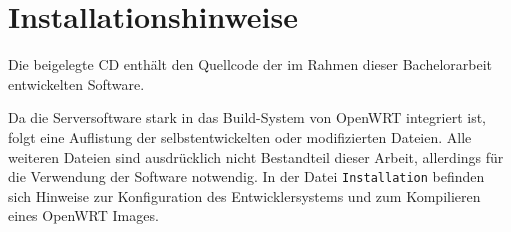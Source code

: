 \chapter{Installationshinweise}
Die beigelegte CD enthält den Quellcode der im Rahmen dieser Bachelorarbeit
entwickelten Software.

Da die Serversoftware stark in das Build-System von OpenWRT integriert
ist, folgt eine Auflistung der selbstentwickelten oder modifizierten Dateien.
\vspace{4pt}
\vspace{4pt}
Alle weiteren Dateien sind ausdrücklich nicht Bestandteil dieser Arbeit,
allerdings für die Verwendung der Software notwendig.
In der Datei \texttt{Installation} befinden sich Hinweise zur Konfiguration des
Entwicklersystems und zum Kompilieren eines OpenWRT Images.